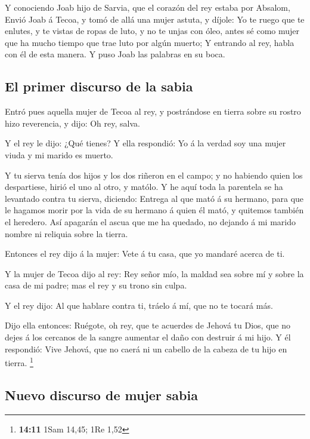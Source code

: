  Y conociendo Joab hijo de Sarvia, que el corazón del rey
estaba por Absalom,  Envió Joab á Tecoa, y tomó de allá
una mujer astuta, y díjole: Yo te ruego que te enlutes, y te vistas de
ropas de luto, y no te unjas con óleo, antes sé como mujer que ha mucho
tiempo que trae luto por algún muerto;  Y entrando al rey,
habla con él de esta manera. Y puso Joab las palabras en su boca.

\hypertarget{el-primer-discurso-de-la-sabia}{%
\subsection{El primer discurso de la
sabia}\label{el-primer-discurso-de-la-sabia}}

 Entró pues aquella mujer de Tecoa al rey, y postrándose
en tierra sobre su rostro hizo reverencia, y dijo: Oh rey, salva.

 Y el rey le dijo: ¿Qué tienes? Y ella respondió: Yo á la
verdad soy una mujer viuda y mi marido es muerto.

 Y tu sierva tenía dos hijos y los dos riñeron en el
campo; y no habiendo quien los despartiese, hirió el uno al otro, y
matólo.  Y he aquí toda la parentela se ha levantado
contra tu sierva, diciendo: Entrega al que mató á su hermano, para que
le hagamos morir por la vida de su hermano á quien él mató, y quitemos
también el heredero. Así apagarán el ascua que me ha quedado, no dejando
á mi marido nombre ni reliquia sobre la tierra.

 Entonces el rey dijo á la mujer: Vete á tu casa, que yo
mandaré acerca de ti.

 Y la mujer de Tecoa dijo al rey: Rey señor mío, la maldad
sea sobre mí y sobre la casa de mi padre; mas el rey y su trono sin
culpa.

 Y el rey dijo: Al que hablare contra ti, tráelo á mí,
que no te tocará más.

 Dijo ella entonces: Ruégote, oh rey, que te acuerdes de
Jehová tu Dios, que no dejes á los cercanos de la sangre aumentar el
daño con destruir á mi hijo. Y él respondió: Vive Jehová, que no caerá
ni un cabello de la cabeza de tu hijo en tierra. \footnote{\textbf{14:11}
  1Sam 14,45; 1Re 1,52}

\hypertarget{nuevo-discurso-de-mujer-sabia}{%
\subsection{Nuevo discurso de mujer
sabia}\label{nuevo-discurso-de-mujer-sabia}}

